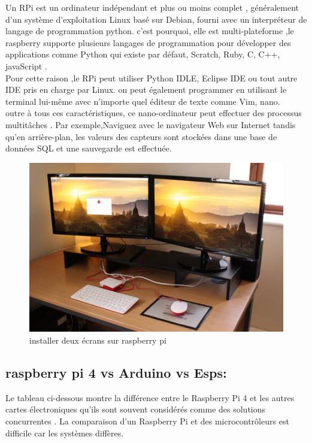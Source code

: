 \vspace{10pt}\newline
Un RPi est un ordinateur indépendant et plus ou moins complet , généralement  d'un système d'exploitation Linux basé sur Debian, fourni avec un interpréteur de langage de programmation python. 
c'est pourquoi, elle est multi-plateforme ,le raspberry supporte plusieurs langages de programmation   pour développer des applications comme Python qui existe par défaut, Scratch, Ruby, C, C++, javaScript .\\
Pour cette raison ,le RPi  peut utiliser Python IDLE, Eclipse IDE ou tout autre IDE pris en charge par Linux. on peut également programmer en utilisant le terminal lui-même avec n'importe quel éditeur de texte comme Vim, nano.\\
\vspace{10pt}\newline
 outre à tous ces caractéristiques,  ce nano-ordinateur peut effectuer des processus multitâches . Par exemple,Naviguez avec le navigateur Web sur Internet tandis qu'en arrière-plan, les valeurs des capteurs sont stockées dans une base de données SQL et une sauvegarde est effectuée.\\
 \begin{figure}[H]
        \centering 
        \includegraphics{figures/chap3/Execution-de-deux-moniteurs-avec-un-Raspberry-Pi.jpg}
         \caption{installer deux écrans sur raspberry pi}
\end{figure} 
 \clearpage
 \subsection{raspberry pi 4 vs Arduino vs Esps:}
 Le tableau ci-dessous montre la différence entre le Raspberry Pi 4 et les autres cartes électroniques qu'ils sont souvent considérés comme des solutions concurrentes . La comparaison d'un Raspberry Pi et des microcontrôleurs  est difficile car les systèmes diffères.\\ 

